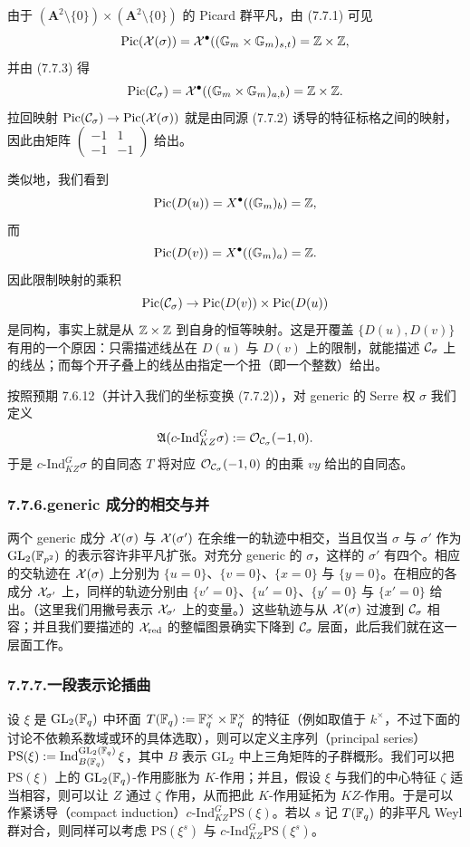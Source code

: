 由于 $(\mathbf A^2\setminus\{0\})\times(\mathbf A^2\setminus\{0\})$ 的 Picard 群平凡，由 (7.7.1) 可见
\[
\mathrm{Pic}(\mathcal{X}(\sigma))=\mathcal{X}^{\bullet}((\mathbb{G}_m\times\mathbb{G}_m)_{s,t})=\mathbb{Z}\times\mathbb{Z},
\]
并由 (7.7.3) 得
\[
\mathrm{Pic}(\mathcal{C}_\sigma)=\mathcal{X}^{\bullet}((\mathbb{G}_m\times\mathbb{G}_m)_{a,b})=\mathbb{Z}\times\mathbb{Z}.
\]
拉回映射 $\mathrm{Pic}(\mathcal{C}_\sigma)\to\mathrm{Pic}(\mathcal{X}(\sigma))$ 就是由同源 (7.7.2) 诱导的特征标格之间的映射，因此由矩阵 $\begin{pmatrix}-1&1\\-1&-1\end{pmatrix}$ 给出。

类似地，我们看到
\[
\mathrm{Pic}(D(u))=X^{\bullet}((\mathbb{G}_m)_b)=\mathbb{Z},
\]
而
\[
\mathrm{Pic}(D(v))=X^{\bullet}((\mathbb{G}_m)_a)=\mathbb{Z}.
\]
因此限制映射的乘积
\[
\mathrm{Pic}(\mathcal{C}_\sigma)\to\mathrm{Pic}(D(v))\times\mathrm{Pic}(D(u))
\]
是同构，事实上就是从 $\mathbb{Z}\times\mathbb{Z}$ 到自身的恒等映射。这是开覆盖 $\{D(u),D(v)\}$ 有用的一个原因：只需描述线丛在 $D(u)$ 与 $D(v)$ 上的限制，就能描述 $\mathcal{C}_\sigma$ 上的线丛；而每个开子叠上的线丛由指定一个扭（即一个整数）给出。

按照预期 7.6.12（并计入我们的坐标变换 (7.7.2)），对 generic 的 Serre 权 $\sigma$ 我们定义
\[
\mathfrak A(c\text{-}\mathrm{Ind}^G_{KZ}\sigma):=\mathcal{O}_{\mathcal{C}_\sigma}(-1,0).
\]
于是 $c\text{-}\mathrm{Ind}^G_{KZ}\sigma$ 的自同态 $T$ 将对应 $\mathcal{O}_{\mathcal{C}_\sigma}(-1,0)$ 的由乘 $vy$ 给出的自同态。

\subsubsection*{7.7.6.\quad generic 成分的相交与并}
两个 generic 成分 $\mathcal{X}(\sigma)$ 与 $\mathcal{X}(\sigma')$ 在余维一的轨迹中相交，当且仅当 $\sigma$ 与 $\sigma'$ 作为 $\mathrm{GL}_2(\mathbb{F}_{p^2})$ 的表示容许非平凡扩张。对充分 generic 的 $\sigma$，这样的 $\sigma'$ 有四个。相应的交轨迹在 $\mathcal{X}(\sigma)$ 上分别为 $\{u=0\}$、$\{v=0\}$、$\{x=0\}$ 与 $\{y=0\}$。在相应的各成分 $\mathcal{X}_{\sigma'}$ 上，同样的轨迹分别由 $\{v'=0\}$、$\{u'=0\}$、$\{y'=0\}$ 与 $\{x'=0\}$ 给出。（这里我们用撇号表示 $\mathcal{X}_{\sigma'}$ 上的变量。）这些轨迹与从 $\mathcal{X}(\sigma)$ 过渡到 $\mathcal{C}_\sigma$ 相容；并且我们要描述的 $\mathcal{X}_{\mathrm{red}}$ 的整幅图景确实下降到 $\mathcal{C}_\sigma$ 层面，此后我们就在这一层面工作。

\subsubsection*{7.7.7.\quad 一段表示论插曲}
设 $\xi$ 是 $\mathrm{GL}_2(\mathbb{F}_q)$ 中环面 $T(\mathbb{F}_q):=\mathbb{F}_q^\times\times\mathbb{F}_q^\times$ 的特征（例如取值于 $k^\times$，不过下面的讨论不依赖系数域或环的具体选取），则可以定义主序列（principal series）$\mathrm{PS}(\xi):=\operatorname{Ind}_{B(\mathbb{F}_q)}^{\mathrm{GL}_2(\mathbb{F}_q)}\xi$，其中 $B$ 表示 $\mathrm{GL}_2$ 中上三角矩阵的子群概形。我们可以把 $\mathrm{PS}(\xi)$ 上的 $\mathrm{GL}_2(\mathbb{F}_q)$-作用膨胀为 $K$-作用；并且，假设 $\xi$ 与我们的中心特征 $\zeta$ 适当相容，则可以让 $Z$ 通过 $\zeta$ 作用，从而把此 $K$-作用延拓为 $KZ$-作用。于是可以作紧诱导（compact induction）$c\text{-}\mathrm{Ind}^G_{KZ}\mathrm{PS}(\xi)$。若以 $s$ 记 $T(\mathbb{F}_q)$ 的非平凡 Weyl 群对合，则同样可以考虑 $\mathrm{PS}(\xi^s)$ 与 $c\text{-}\mathrm{Ind}^G_{KZ}\mathrm{PS}(\xi^s)$。

